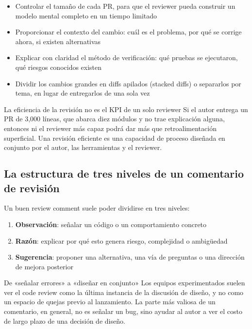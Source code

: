 \documentclass[a4paper]{article}
\begin{document}
\begin{itemize}
    \item Controlar el tamaño de cada PR, para que el reviewer pueda construir un modelo mental completo en un tiempo limitado
    \item Proporcionar el contexto del cambio: cuál es el problema, por qué se corrige ahora, si existen alternativas
    \item Explicar con claridad el método de verificación: qué pruebas se ejecutaron, qué riesgos conocidos existen
    \item Dividir los cambios grandes en diffs apilados (stacked diffs) o separarlos por tema, en lugar de entregarlos de una sola vez
\end{itemize}

\begin{importantbox}{La eficiencia de la revisión no es el KPI de un solo reviewer}
Si el autor entrega un PR de 3,000 líneas, que abarca diez módulos y no trae explicación alguna, entonces ni el reviewer más capaz podrá dar más que retroalimentación superficial. Una revisión eficiente es una capacidad de proceso diseñada en conjunto por el autor, las herramientas y el reviewer.
\end{importantbox}

\subsection{La estructura de tres niveles de un comentario de revisión}

Un buen review comment suele poder dividirse en tres niveles:

\begin{enumerate}
    \item \textbf{Observación}: señalar un código o un comportamiento concreto
    \item \textbf{Razón}: explicar por qué esto genera riesgo, complejidad o ambigüedad
    \item \textbf{Sugerencia}: proponer una alternativa, una vía de preguntas o una dirección de mejora posterior
\end{enumerate}

\begin{knowledgebox}{De «señalar errores» a «diseñar en conjunto»}
Los equipos experimentados suelen ver el code review como la última instancia de la discusión de diseño, y no como un espacio de quejas previo al lanzamiento. La parte más valiosa de un comentario, en general, no es señalar un bug, sino ayudar al autor a ver el costo de largo plazo de una decisión de diseño.
\end{knowledgebox}
\end{document}
